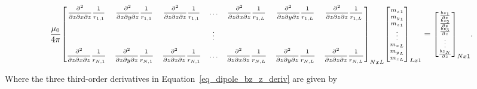 \begin{equation}
\footnotesize
\label{eq_dipole_bz_z_deriv}
\dfrac{\mu_0}{4\pi}
\scriptsize{\begin{bmatrix}
\dfrac{\partial^2}{\partial z \partial x \partial z} \dfrac{1}{r_{1,1}}
& \dfrac{\partial^2}{\partial z \partial y \partial z} \dfrac{1}{r_{1,1}}
& \dfrac{\partial^2}{\partial z \partial z \partial z} \dfrac{1}{r_{1,1}}
& \hdots
& \dfrac{\partial^2}{\partial z \partial x \partial z} \dfrac{1}{r_{1,L}}
& \dfrac{\partial^2}{\partial z \partial y \partial z} \dfrac{1}{r_{1,L}}
& \dfrac{\partial^2}{\partial z \partial z \partial z} \dfrac{1}{r_{1,L}} \\
\\

& 
& 
& \vdots
& 
& 
&  \\
\\
\dfrac{\partial^2}{\partial z \partial x \partial z} \dfrac{1}{r_{N,1}}
& \dfrac{\partial^2}{\partial z \partial y \partial z} \dfrac{1}{r_{N,1}}
& \dfrac{\partial^2}{\partial z \partial z \partial z} \dfrac{1}{r_{N,1}}
& \hdots
& \dfrac{\partial^2}{\partial z \partial x \partial z} \dfrac{1}{r_{N,L}}
& \dfrac{\partial^2}{\partial z \partial y \partial z} \dfrac{1}{r_{N,L}}
& \dfrac{\partial^2}{\partial z \partial z \partial z} \dfrac{1}{r_{N,L}} \\
\end{bmatrix}}_{N x L}
{\begin{bmatrix}
{m_x}_1 \\ {m_y}_1 \\ {m_z}_1 \\ \vdots \\{m_x}_L \\ {m_y}_L \\ {m_z}_L \\
\end{bmatrix}}_{L x 1}
=
{\begin{bmatrix}
\frac{{bz}_1}{ \partial z} \\ \frac{{bz}_2}{ \partial z} \\ \frac{{bz}_3}{ \partial z} \\ \vdots \\\frac{{bz}_N}{ \partial z}
\end{bmatrix}}_{N x 1}.
\end{equation} \bigskip

Where the three third-order derivatives in Equation~\ref{eq_dipole_bz_z_deriv} are given by

